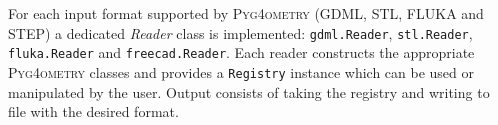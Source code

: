 \documentclass[final,5p,times,twocolumn]{elsarticle}
\newcommand{\PYGEOMETRY}{\textsc{Pyg4ometry}}
\begin{document}
%


For each input format supported by \PYGEOMETRY{}  (GDML, STL, FLUKA and STEP) a dedicated \emph{Reader} class is implemented: \verb|gdml.Reader|,
\verb|stl.Reader|, \verb|fluka.Reader| and \verb|freecad.Reader|. Each reader constructs the appropriate \PYGEOMETRY{} classes and provides a \verb|Registry| instance which
can be used or manipulated by the user.
Output consists of taking the registry and writing to file with the desired format.
\end{document}
